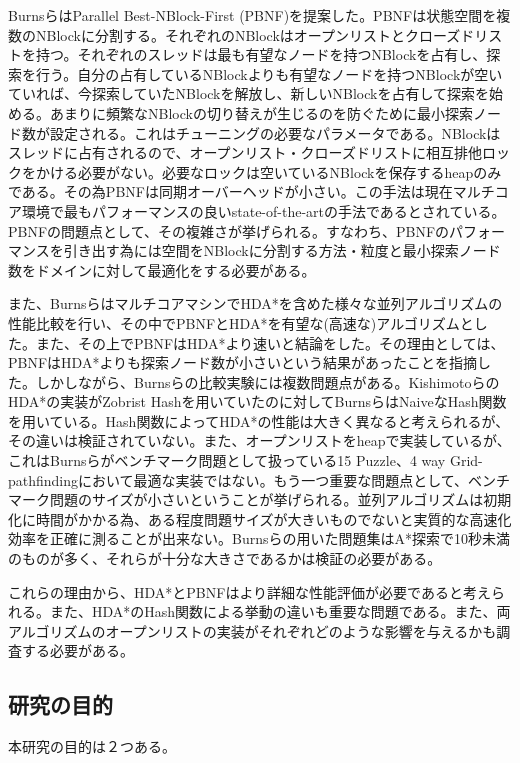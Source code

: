 \documentclass{jsarticle}
\begin{document}
BurnsらはParallel Best-NBlock-First (PBNF)を提案した\cite{Burns2010}。PBNFは状態空間を複数のNBlockに分割する。それぞれのNBlockはオープンリストとクローズドリストを持つ。それぞれのスレッドは最も有望なノードを持つNBlockを占有し、探索を行う。自分の占有しているNBlockよりも有望なノードを持つNBlockが空いていれば、今探索していたNBlockを解放し、新しいNBlockを占有して探索を始める。あまりに頻繁なNBlockの切り替えが生じるのを防ぐために最小探索ノード数が設定される。これはチューニングの必要なパラメータである。NBlockはスレッドに占有されるので、オープンリスト・クローズドリストに相互排他ロックをかける必要がない。必要なロックは空いているNBlockを保存するheapのみである。その為PBNFは同期オーバーヘッドが小さい。この手法は現在マルチコア環境で最もパフォーマンスの良いstate-of-the-artの手法であるとされている。PBNFの問題点として、その複雑さが挙げられる。すなわち、PBNFのパフォーマンスを引き出す為には空間をNBlockに分割する方法・粒度と最小探索ノード数をドメインに対して最適化をする必要がある。

また、BurnsらはマルチコアマシンでHDA*を含めた様々な並列アルゴリズムの性能比較を行い、その中でPBNFとHDA*を有望な(高速な)アルゴリズムとした。また、その上でPBNFはHDA*より速いと結論をした。その理由としては、PBNFはHDA*よりも探索ノード数が小さいという結果があったことを指摘した。しかしながら、Burnsらの比較実験には複数問題点がある。KishimotoらのHDA*の実装がZobrist Hash\cite{Zobrist1970}を用いていたのに対してBurnsらはNaiveなHash関数を用いている。Hash関数によってHDA*の性能は大きく異なると考えられるが、その違いは検証されていない。また、オープンリストをheapで実装しているが、これはBurnsらがベンチマーク問題として扱っている15 Puzzle、4 way Grid-pathfindingにおいて最適な実装ではない\cite{burns2012implementing}。もう一つ重要な問題点として、ベンチマーク問題のサイズが小さいということが挙げられる。並列アルゴリズムは初期化に時間がかかる為、ある程度問題サイズが大きいものでないと実質的な高速化効率を正確に測ることが出来ない。Burnsらの用いた問題集はA*探索で10秒未満のものが多く、それらが十分な大きさであるかは検証の必要がある。

これらの理由から、HDA*とPBNFはより詳細な性能評価が必要であると考えられる。また、HDA*のHash関数による挙動の違いも重要な問題である。また、両アルゴリズムのオープンリストの実装がそれぞれどのような影響を与えるかも調査する必要がある。

\subsection{研究の目的}

本研究の目的は２つある。
\end{document}
